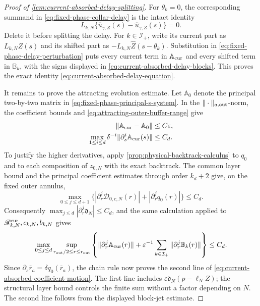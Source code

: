 \begin{proof}[Proof of
\cref{lem:current-absorbed-delay-splitting}]
For \(\theta_k=0\), the corresponding summand in
\cref{eq:fixed-phase-collar-delay} is the intact identity
\[
 L_{k,N}\{\widehat u_{\gamma,Z}(s)
                -\widehat u_{\gamma,Z}(s)\}=0.
\]
Delete it before splitting the delay.  For \(k\in\mathcal I_+\), write its
current part as \(L_{k,N}Z(s)\) and its shifted part as
\(-L_{k,N}\widehat Z(s-\theta_k)\).  Substitution in
\cref{eq:fixed-phase-delay-perturbation} puts every current term in
\(\mathbb A_{\rm cur}\) and every shifted term in \(\mathbb B_k\), with the
signs displayed in \cref{eq:current-absorbed-delay-blocks}.  This proves the
exact identity \cref{eq:current-absorbed-delay-equation}.

It remains to prove the attracting evolution estimate.  Let
\(\mathbb A_0\) denote the principal two-by-two matrix in
\cref{eq:fixed-phase-principal-s-system}.  In the
\(\|\cdot\|_{a,\rm out}\)-norm, the coefficient bounds and
\cref{eq:attracting-outer-buffer-range} give
\begin{align}
 \|\mathbb A_{\rm cur}-\mathbb A_0\|&\le C\varepsilon,\notag\\
 \max_{1\le i\le d}\delta^{-i}
 \|\partial_s^i\mathbb A_{\rm cur}(s)\|&\le C_d.   \label{eq:current-absorbed-coefficient-motion}
\end{align}
To justify the higher derivatives, apply
\cref{prop:physical-backtrack-calculus} to \(q_0\) and to each composition
of \(z_{0,N}\) with its exact backtrack.  The common layer bound and the
principal coefficient estimates through order \(k_d+2\) give, on the fixed
outer annulus,
\begin{equation}
 \max_{0\le j\le d+1}
 \bigl\{|\partial_r^j\mathcal D_{0,c,N}(r)|
              +|\partial_r^jq_0(r)|\bigr\}\le C_d.            \label{eq:current-absorbed-D0-jets}
\end{equation}
Consequently
\(\max_{j\le d}|\partial_r^j\mathfrak d_N|\le C_d\), and the
same calculation applied to
\(\mathscr R_{k,N}^{\rm cur},c_{k,N},b_{k,N}\) gives
\begin{equation}
 \max_{0\le j\le d}\sup_{r_{\rm out}/2\le r\le r_{\rm out}}
 \left\{\|\partial_r^j\mathbb A_{\rm cur}(r)\|
   +\varepsilon^{-1}\sum_{k\in\mathcal I_+}
        \|\partial_r^j\mathbb B_k(r)\|\right\}\le C_d.       \label{eq:current-absorbed-block-jets}
\end{equation}
Since \(\partial_s\bar r_a=\delta q_0(\bar r_a)\), the chain rule now
proves the second line of
\cref{eq:current-absorbed-coefficient-motion}.  The first line includes
\(\varepsilon\mathfrak d_N(p-\ell_NZ)\); the structural layer bound controls
the finite sum without a factor depending on \(N\).  The second line follows
from the displayed block-jet estimate.


\end{proof}
